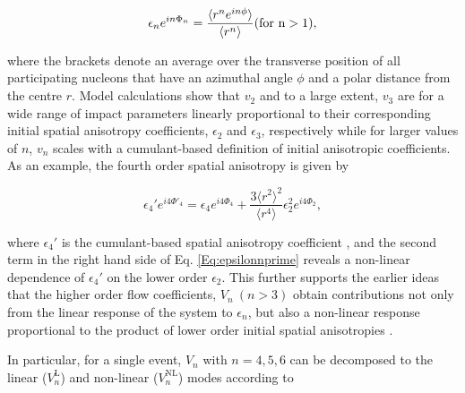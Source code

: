 \begin{equation}
\epsilon_{n}e^{in\Phi_n} = \frac{\langle{r^{n}e^{in\phi}}\rangle}{\langle r^n\rangle}  (\rm{for}~n>1),
\label{Eq:epsilonn}
\end{equation}

where the brackets denote an average over the transverse position of all participating nucleons that have an azimuthal angle $\phi$ and a polar distance from the centre $r$. Model calculations show that $v_2$ and to a large extent, $v_3$ are for a wide range of impact parameters linearly proportional to their corresponding initial spatial anisotropy coefficients, $\epsilon_{2}$ and $\epsilon_{3}$, respectively \cite{Alver:2010gr} while for larger values of $n$, $v_{n}$ scales with a cumulant-based definition of initial anisotropic coefficients. %
As an example, the fourth order spatial anisotropy is given by 

 
\begin{equation}
\epsilon_{4}'e^{i4\Phi'_4} = \epsilon_{4}e^{i4\Phi_4}  + \frac{3\langle{r^{2}}\rangle^{2}}{\langle r^4\rangle}\epsilon_{2}^{2}e^{i4\Phi_2},
\label{Eq:epsilonnprime}
\end{equation}

where $\epsilon_{4}'$ is the cumulant-based spatial anisotropy coefficient \cite{Teaney:2013dta,Qian:2017ier}, and the second term in the right hand side of Eq. \ref{Eq:epsilonnprime} reveals a non-linear dependence of $\epsilon_{4}'$ on the lower order $\epsilon_{2}$. This further supports the earlier ideas that the higher order flow coefficients, $V_n~(n > 3)$ obtain contributions not only from the linear response of the system to $\epsilon_{n}$, but also a non-linear response proportional to the product of lower order initial spatial anisotropies \cite{Bhalerao:2014xra,Yan:2015jma}. 

In particular, for a single event, $V_n$ with $n=4,5,6$ can be decomposed to the linear ($V_{n}^{\mathrm{L}} $) and non-linear ($ V_{n}^{\mathrm{NL}}$) modes according to%

